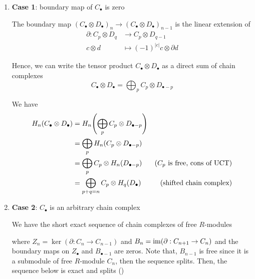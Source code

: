 \begin{longproof}
	\begin{enumerate}
		\item \textbf{Case 1}: boundary map of $C_\bullet$ is zero
		
		The boundary map $(C_\bullet \otimes D_\bullet)_n \to (C_\bullet \otimes D_\bullet)_{n-1}$ is the linear extension of
		\begin{align*}
			\partial:   C_p \otimes D_q &\to C_p \otimes D_{q-1} \\
			c \otimes d &\mapsto (-1)^{|c|} c \otimes \partial d
		\end{align*}
		
		Hence, we can write the tensor product $C_\bullet \otimes D_\bullet$ as a direct sum of chain complexes
		$$
		C_\bullet \otimes D_\bullet = \bigoplus_p C_p \otimes D_{\bullet - p}
		$$
		
		We have
		\begin{align*}
			H_n(C_\bullet \otimes D_\bullet) 
			&= H_n\tuple*{\bigoplus_p C_p \otimes D_{\bullet-p}} \\
			&= \bigoplus_p H_n(C_p \otimes D_{\bullet-p}) \\
			&= \bigoplus_p C_p \otimes H_n(D_{\bullet - p}) &\text{($C_p$ is free, cons of UCT)}\\
			&= \bigoplus_{p + q = n} C_p \otimes H_q(D_\bullet)&\text{(shifted chain complex)}
		\end{align*}
		
		\item \textbf{Case 2}: $C_\bullet$ is an arbitrary chain complex
		
		We have the short exact sequence of chain complexes of free $R$-modules
		\begin{center}
		\end{center}
		
		where $Z_n = \ker(\partial: C_n \to C_{n-1})$ and $B_n = \operatorname{im} (\partial: C_{n+1} \to C_n)$ and the boundary maps on $Z_\bullet$ and $B_{\bullet-1}$ are zeros. Note that, $B_{n-1}$ is free since it is a submodule of free $R$-module $C_n$, then the sequence splits. Then, the sequence below is exact and splits ()
		

\end{enumerate}
\end{longproof}
